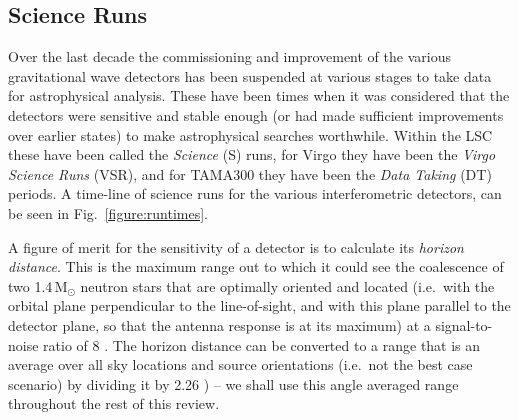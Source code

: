 \documentclass{article}
\begin{document}
\subsection{Science Runs}\label{subsection:runs}
Over the last decade the commissioning and improvement of the various
gravitational wave detectors has been suspended at various stages to take data
for astrophysical analysis. These have been times when it was considered that
the detectors were sensitive and stable enough (or had made sufficient
improvements over earlier states) to make astrophysical searches worthwhile.
Within the LSC these have been called the {\it Science} (S) runs, for Virgo they
have been the {\it Virgo Science Runs} (VSR), and for TAMA300 they have been
the {\it Data Taking} (DT) periods. A time-line of science runs for the various
interferometric detectors, can be seen in Fig.~\ref{figure:runtimes}.


A figure of merit for the sensitivity of a detector is to calculate its {\it
horizon distance}. This is the maximum range out to which it could see the
coalescence of two 1.4\,M$_{\odot}$ neutron stars that are optimally oriented
and located (i.e.~with the orbital plane perpendicular to the line-of-sight, and
with this plane parallel to the detector plane, so that the antenna response is
at its maximum) at a signal-to-noise ratio of 8 \cite{Abbott:2005b}. The horizon
distance can be converted to a range that is an average over all sky locations
and source orientations (i.e.~not the best case scenario) by dividing it by 2.26
\cite{Sutton:2003}) -- we shall use this angle averaged range throughout the
rest of this review.
\end{document}
